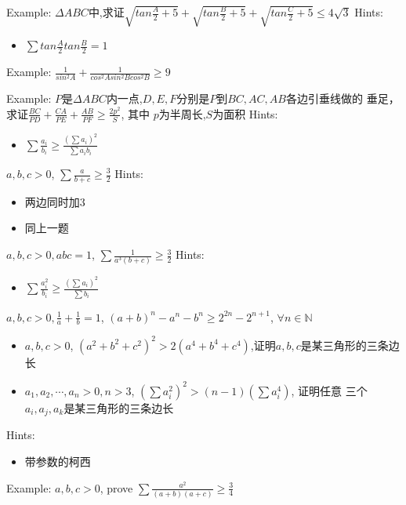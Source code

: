 \clearpage
Example: $\Delta ABC$中,求证$\sqrt{tan \frac{A}{2}+5}+\sqrt{tan \frac{B}{2}+5}+
\sqrt{tan \frac{C}{2}+5}\leq 4\sqrt{3}$
\clearpage
Hints:
\begin{itemize}
\item $\sum tan \frac{A}{2} tan \frac{B}{2} =1$ 
\end{itemize}


\clearpage
Example: $\frac{1}{sin^2A}+\frac{1}{cos^2A sin^2B cos^2B}\geq 9$


\clearpage
Example: $P$是$\Delta ABC$内一点,$D,E,F$分别是$P$到$BC,AC,AB$各边引垂线做的
垂足，求证$\frac{BC}{PD}+\frac{CA}{PE}+\frac{AB}{PF}\geq \frac{2p^2}{S}$, 其中
$p$为半周长,$S$为面积 
\clearpage
Hints:
\begin{itemize}
\item $\sum \frac{a_i}{b_i}\geq \frac{(\sum a_i)^2}{\sum a_ib_i}$ 
\end{itemize}


\clearpage
$a,b,c>0$, $\sum \frac{a}{b+c}\geq \frac{3}{2}$
\clearpage
Hints:
\begin{itemize}
\item 两边同时加3
\item 同上一题 
\end{itemize}


\clearpage
$a,b,c>0, abc=1$, $\sum \frac{1}{a^3(b+c)}\geq \frac{3}{2}$
\clearpage
Hints:
\begin{itemize}
\item $\sum \frac{a_i^2}{b_i}\geq \frac{(\sum a_i)^2}{\sum b_i}$ 
\end{itemize}


\clearpage
$a,b,c>0, \frac{1}{a}+\frac{1}{b}=1$, $(a+b)^n-a^n-b^n \geq 2^{2n}-2^{n+1}$, 
$\forall n \in \mathbb{N}$


\clearpage
\begin{itemize}
\item $a,b,c>0$, $(a^2+b^2+c^2)^2>2(a^4+b^4+c^4)$,证明$a,b,c$是某三角形的三条边长 
\item $a_1,a_2,\cdots, a_n>0, n>3$, $(\sum a_i^2)^2>(n-1)(\sum a_i^4)$, 证明任意
三个$a_i,a_j,a_k$是某三角形的三条边长
\end{itemize}
\clearpage
Hints:
\begin{itemize}
\item 带参数的柯西
\end{itemize}


\clearpage
Example: $a,b,c>0$, prove $\sum \frac{a^2}{(a+b)(a+c)}\geq \frac{3}{4}$









